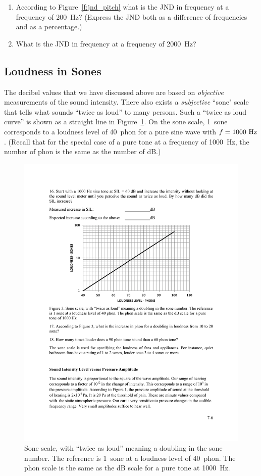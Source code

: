 \documentclass[11pt]{NSF}
\def\ben{\begin{enumerate}}
\def\een{\end{enumerate}}
\begin{document}
\ben
\item 
According to Figure~\ref{f:jnd_pitch} what is the JND in frequency
at a frequency of 200~Hz?
(Express the JND both as a difference of frequencies and as a 
percentage.)

\item What is the JND in frequency at a frequency of 2000~Hz?
\een

\subsection{Loudness in Sones}

The decibel values that we have discussed above are based on 
{\em objective} measurements of the sound intensity. 
There also exists a {\em subjective} ``sone" scale that tells 
what sounds ``twice as loud” to many persons. 
Such a ``twice as loud curve” is shown as a straight line in 
Figure~\ref{f:3}. 
On the sone scale, 1~sone corresponds to a loudness level of 
40~phon for a pure sine wave with $f = 1000~{\rm Hz}$. 
(Recall that for the special case of a pure tone at a frequency 
of 1000~Hz, the number of phon is the same 
as the number of dB.)
%
\begin{figure}[hbtp]
\begin{center}
\includegraphics[width=.6\textwidth]{fig7_3}
\caption{Sone scale, with ``twice as loud” meaning a doubling in the
sone number. The reference is 1~sone at a loudness level of 40~phon.
The phon scale is the same as the dB scale for a pure tone at 1000~Hz.}
\label{f:3}
\end{center}
\end{figure}
\end{document}
